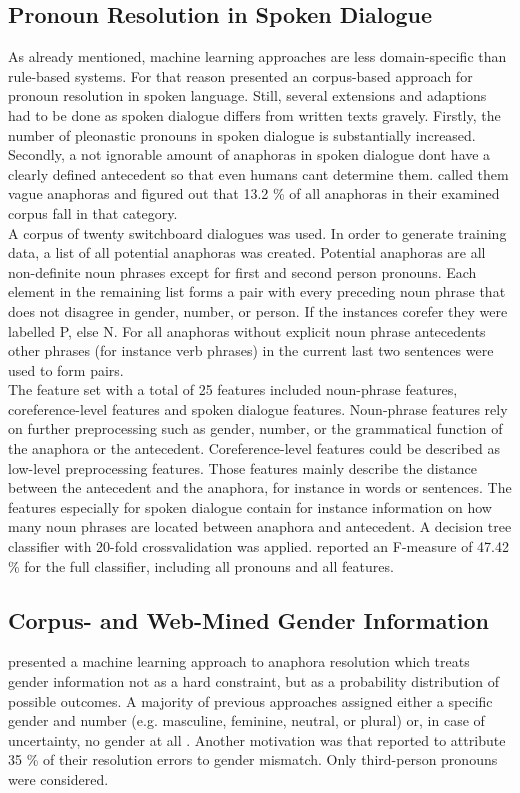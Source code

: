 \subsection{Pronoun Resolution in Spoken Dialogue}
As already mentioned, machine learning approaches are less domain-specific than rule-based systems. For that reason \citep{strube2003machine} presented an corpus-based approach for pronoun resolution in spoken language. Still, several extensions and adaptions had to be done as spoken dialogue differs from written texts gravely. Firstly, the number of pleonastic pronouns in spoken dialogue is substantially increased. Secondly, a not ignorable amount of anaphoras in spoken dialogue dont have a clearly defined antecedent so that even humans cant determine them. \citep{eckert2000dialogue} called them vague anaphoras and figured out that 13.2 \% of all anaphoras in their examined corpus fall in that category.\\
A corpus of twenty switchboard dialogues was used. In order to generate training data, a list of all potential anaphoras was created. Potential anaphoras are all non-definite noun phrases except for first and second person pronouns. Each element in the remaining list forms a pair with every preceding noun phrase that does not disagree in gender, number, or person. If the instances corefer they were labelled P, else N. For all anaphoras without explicit noun phrase antecedents other phrases (for instance verb phrases) in the current last two sentences were used to form pairs. \\
The feature set with a total of 25 features included noun-phrase features, coreference-level features and spoken dialogue features. Noun-phrase features rely on further preprocessing such as gender, number, or the grammatical function of the anaphora or the antecedent. Coreference-level features could be described as low-level preprocessing features. Those features mainly describe the distance between the antecedent and the anaphora, for instance in words or sentences. The features especially for spoken dialogue contain for instance information on how many noun phrases are located between anaphora and antecedent.
A decision tree classifier with 20-fold crossvalidation was applied. \citep{strube2003machine} reported an F-measure of 47.42 \% for the full classifier, including all pronouns and all features. 


\subsection{Corpus- and Web-Mined Gender Information}
\cite{bergsma2005automatic} presented a machine learning approach to anaphora resolution which treats gender information not as a hard constraint, but as a probability distribution of possible outcomes. A majority of previous approaches assigned either a specific gender and number (e.g. masculine, feminine, neutral, or plural) or, in case of uncertainty, no gender at all \citep{soon2001machine, broscheit2010bart}. Another motivation was that \cite{kennedy1996anaphora} reported to attribute 35 \% of their resolution errors to gender mismatch. Only third-person pronouns were considered.

